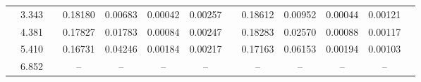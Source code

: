 \documentclass[aps,prc,superscriptaddress,showpacs,floatfix,twocolumn]{revtex4}
\begin{document}
\begin{table}[htbp]
\begin{ruledtabular}
\begin{tabular}{c|cccccccccccc}
 & 3.343 && 0.18180 & 0.00683 & 0.00042 & 0.00257 & & 0.18612 & 0.00952 & 0.00044 & 0.00121 \\ 
 & 4.381 && 0.17827 & 0.01783 & 0.00084 & 0.00247 & & 0.18283 & 0.02570 & 0.00088 & 0.00117 \\ 
 & 5.410 && 0.16731 & 0.04246 & 0.00184 & 0.00217 & & 0.17163 & 0.06153 & 0.00194 & 0.00103 \\ 
 & 6.852 && -- & -- & -- & -- & & -- & -- & -- & -- \\ 
\end{tabular} \end{ruledtabular} \endgroup
\end{table}

\end{document}

